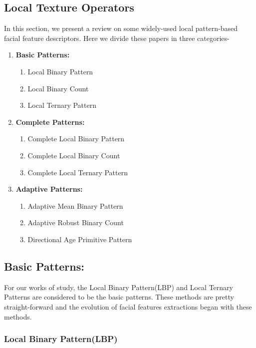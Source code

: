 \documentclass[12pt]{article}
\begin{document}
\subsection{Local Texture Operators}

In this section, we present a review on some widely-used local pattern-based facial
feature descriptors. Here we divide these papers in three categories-
\begin{enumerate}
	\item \textbf{Basic Patterns:} 
	\begin{enumerate}
		\item Local Binary Pattern
		\item Local Binary Count
		\item Local Ternary Pattern
	\end{enumerate}
	\item \textbf{Complete Patterns:}
	\begin{enumerate}
		\item Complete Local Binary Pattern
		\item Complete Local Binary Count
		\item Complete Local Ternary Pattern
	\end{enumerate}
	
	\item \textbf{Adaptive Patterns:}
	\begin{enumerate}
		\item Adaptive Mean Binary Pattern
		\item Adaptive Robust Binary Count
		\item Directional Age Primitive Pattern
		
	\end{enumerate}
\end{enumerate} 

\subsection{Basic Patterns:}
\label{sec:sec01}
For our works of study, the Local Binary Pattern(LBP) and Local Ternary Patterns are considered to be the basic patterns. These methods are pretty straight-forward and the evolution of facial features extractions began with these methods.

\subsubsection{Local Binary Pattern(LBP)}
\end{document}
